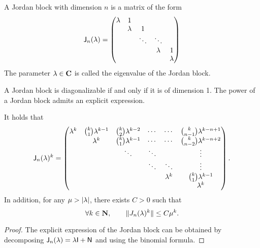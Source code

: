 \begin{definition}
    A Jordan block with dimension $n$ is a matrix of the form
    \[
        \mathsf J_{n}(\lambda) =
        \begin{pmatrix}
            \lambda & 1  \\
          & \lambda & 1 \\
          &         & \ddots  & \ddots  \\
          &         &         & \lambda & 1  \\
          &         &         &         & \lambda
        \end{pmatrix}
    \]
    The parameter $\lambda \in \mathbf C$ is called the eigenvalue of the Jordan block.
\end{definition}
A Jordan block is diagonalizable if and only if it is of dimension 1.
The power of a Jordan block admits an explicit expression.
\begin{lemma}
    \label{lemma:matrices_power_jordan_block}
    It holds that
    \begin{equation}
        \label{eq:matrices_power_jordan_block}
        \mathsf J_n(\lambda)^k =
        \begin{pmatrix}
            \lambda^k & \binom{k}{1}\lambda^{k-1} & \binom{k}{2}\lambda^{k-2} & \cdots & \cdots & \binom{k}{n-1}\lambda^{k-n+1} \\
                      & \lambda^k & \binom{k}{1}\lambda^{k-1} & \cdots & \cdots & \binom{k}{n-2}\lambda^{k-n+2} \\
                      &  & \ddots & \ddots &  & \vdots\\
                      &  & & \ddots & \ddots & \vdots\\
                      &  & &  & \lambda^k & \binom{k}{1}\lambda^{k-1}\\
                      &  &  &  &  & \lambda^k
        \end{pmatrix}.
    \end{equation}
    In addition, for any $\mu > \lvert\lambda\rvert$,
    there exists $C > 0$ such that
    \[
        \forall k \in \mathbf N, \qquad
        \lVert J_{n}(\lambda)^k\rVert \leq C \mu^k.
    \]
\end{lemma}
\begin{proof}
    The explicit expression of the Jordan block can be obtained by decomposing $\mathsf J_{n}(\lambda) = \lambda \mathsf I + \mathsf N$
    and using the binomial formula.
\end{proof}

